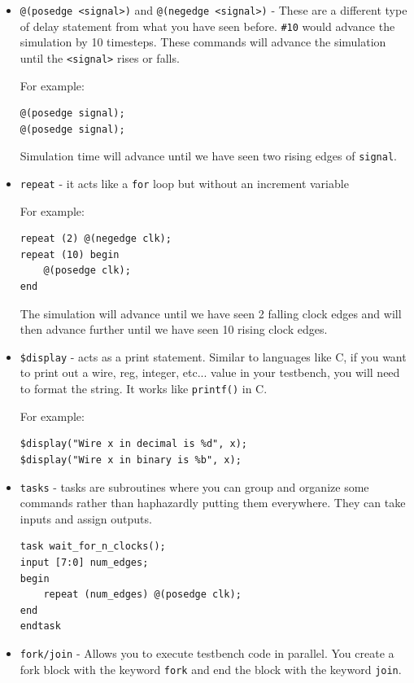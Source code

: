 \documentclass[11pt]{article}
\begin{document}
\begin{itemize}
\item \verb|@(posedge <signal>)| and \verb|@(negedge <signal>)| - These are a different type of delay statement from what you have seen before. \verb|#10| would advance the simulation by 10 timesteps. These commands will advance the simulation until the \verb|<signal>| rises or falls.

For example:
\begin{verbatim}
@(posedge signal);
@(posedge signal);
\end{verbatim}

Simulation time will advance until we have seen two rising edges of \verb|signal|.

\item \verb|repeat| - it acts like a \verb|for| loop but without an increment variable

For example:
\begin{verbatim}
repeat (2) @(negedge clk);
repeat (10) begin 
	@(posedge clk);
end
\end{verbatim} 

The simulation will advance until we have seen 2 falling clock edges and will then advance further until we have seen 10 rising clock edges.

\item \verb|$display| - acts as a print statement. Similar to languages like C, if you want to print out a wire, reg, integer, etc... value in your testbench, you will need to format the string. It works like \verb|printf()| in C.

For example:
\begin{verbatim}
$display("Wire x in decimal is %d", x);
$display("Wire x in binary is %b", x);
\end{verbatim} 

\item \verb|tasks| - tasks are subroutines where you can group and organize some commands rather than haphazardly putting them everywhere. They can take inputs and assign outputs. 

\begin{verbatim}
task wait_for_n_clocks();
input [7:0] num_edges;
begin
	repeat (num_edges) @(posedge clk);
end
endtask
\end{verbatim}

\item \verb|fork/join| - Allows you to execute testbench code in parallel. You create a fork block with the keyword \verb|fork| and end the block with the keyword \verb|join|.


\end{itemize}
\end{document}
